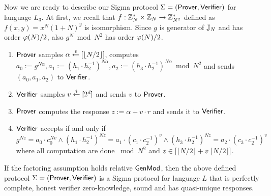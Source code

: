 Now we are ready to describe our Sigma protocol $\Sigma = (\mathsf{Prover}, \mathsf{Verifier})$ for language $L_3$. At first, we recall that $f:\mathbb{Z}_N^* \times \mathbb{Z}_N \rightarrow \mathbb{Z}_{N^2}^*$ defined as $f(x,y)=x^N(1+N)^y$ is isomorphism. Since $g$ is generator of $\mathbb{J}_N$ and has order $\varphi(N)/2$, also $g^N \bmod N^2$ has order $\varphi(N)/2$. 
\begin{enumerate}
\item $\mathsf{Prover}$ samples $\alpha \stackrel{{\scriptscriptstyle\$}}{\leftarrow} [\left\lfloor N/2 \right\rfloor]$, computes $a_0:=g^{N\alpha}, a_1:= (h_1\cdot h_2^{-1})^{N\alpha}, a_2:= (h_3\cdot h_2^{-1})^{N\alpha} \bmod N^2$ and sends $(a_0, a_1, a_2)$ to $\mathsf{Verifier}$.
\item $\mathsf{Verifier}$ samples $v \stackrel{{\scriptscriptstyle\$}}{\leftarrow} [2^d]$ and sends $v$ to $\mathsf{Prover}$.
\item $\mathsf{Prover}$ computes the response $z:= \alpha + v \cdot r$ and sends it to $\mathsf{Verifier}$.
\item $\mathsf{Verifier}$ accepts if and only if $g^{Nz} = a_0 \cdot c_0^{Nv} \land (h_1\cdot h_2^{-1})^{Nz} = a_1 \cdot (c_1\cdot c_2^{-1})^v  \land (h_3\cdot h_2^{-1})^{Nz} = a_2 \cdot (c_3\cdot c_2^{-1})^v$ where all computation are done $\bmod N^2$ and $z \in [\left\lfloor N/2 \right\rfloor + v\left\lfloor N/2 \right\rfloor]$.
\end{enumerate}

\begin{theorem}
If the factoring assumption holds relative $\mathsf{GenMod}$, then the above defined protocol $\Sigma = (\mathsf{Prover}, \mathsf{Verifier})$ is a Sigma protocol for language $L$ that is perfectly complete, honest verifier zero-knowledge, sound and has quasi-unique responses. 
\end{theorem}

